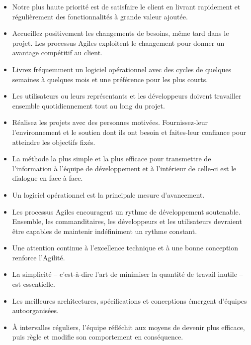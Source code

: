\begin{itemize}

\item Notre plus haute priorité est de satisfaire le client
en livrant rapidement et régulièrement des fonctionnalités
à grande valeur ajoutée.

\item Accueillez positivement les changements de besoins,
même tard dans le projet. Les processus Agiles
exploitent le changement pour donner un avantage
compétitif au client.

\item Livrez fréquemment un logiciel opérationnel avec des
cycles de quelques semaines à quelques mois et une
préférence pour les plus courts.

\item Les utilisateurs ou leurs représentants et les
développeurs doivent travailler ensemble quotidiennement
tout au long du projet.

\item Réalisez les projets avec des personnes motivées.
Fournissez-leur l’environnement et le soutien dont ils
ont besoin et faites-leur confiance pour atteindre les
objectifs fixés.

\item La méthode la plus simple et la plus efficace pour
transmettre de l’information à l'équipe de développement
et à l’intérieur de celle-ci est le dialogue en face à face.

\item Un logiciel opérationnel est la principale mesure d’avancement.

\item Les processus Agiles encouragent un rythme de développement
soutenable. Ensemble, les commanditaires, les développeurs
et les utilisateurs devraient être capables de maintenir
indéfiniment un rythme constant.

\item Une attention continue à l'excellence technique et
à une bonne conception renforce l’Agilité.

\item La simplicité – c’est-à-dire l’art de minimiser la
quantité de travail inutile – est essentielle.

\item Les meilleures architectures, spécifications et
conceptions émergent d'équipes autoorganisées.

\item À intervalles réguliers, l'équipe réfléchit aux moyens
de devenir plus efficace, puis règle et modifie son
comportement en conséquence.

\end{itemize}
